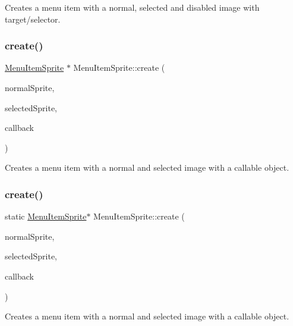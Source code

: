 Creates a menu item with a normal, selected and disabled image with target/selector. \mbox{\label{classMenuItemSprite_af57ca0a6a30385d69ba63706f1720cca}} 
\subsubsection{\texorpdfstring{create()}{create()}\hspace{0.1cm}{\footnotesize\ttfamily [7/10]}}
{\footnotesize\ttfamily \hyperlink{classMenuItemSprite}{Menu\+Item\+Sprite} $\ast$ Menu\+Item\+Sprite\+::create (\begin{DoxyParamCaption}\item[{\hyperlink{classNode}{Node} $\ast$}]{normal\+Sprite,  }\item[{\hyperlink{classNode}{Node} $\ast$}]{selected\+Sprite,  }\item[{const cc\+Menu\+Callback \&}]{callback }\end{DoxyParamCaption})\hspace{0.3cm}{\ttfamily [static]}}

Creates a menu item with a normal and selected image with a callable object. \mbox{\label{classMenuItemSprite_a35e7a06854e600975e52e84800060409}} 
\subsubsection{\texorpdfstring{create()}{create()}\hspace{0.1cm}{\footnotesize\ttfamily [8/10]}}
{\footnotesize\ttfamily static \hyperlink{classMenuItemSprite}{Menu\+Item\+Sprite}$\ast$ Menu\+Item\+Sprite\+::create (\begin{DoxyParamCaption}\item[{\hyperlink{classNode}{Node} $\ast$}]{normal\+Sprite,  }\item[{\hyperlink{classNode}{Node} $\ast$}]{selected\+Sprite,  }\item[{const cc\+Menu\+Callback \&}]{callback }\end{DoxyParamCaption})\hspace{0.3cm}{\ttfamily [static]}}

Creates a menu item with a normal and selected image with a callable object. \mbox{\label{classMenuItemSprite_a21ac709eaea185cb630e665f62d1f453}} 
